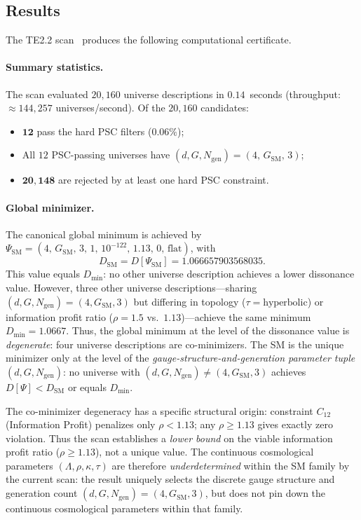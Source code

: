 \documentclass[11pt,twocolumn]{article}
\theoremstyle{remark}
\begin{document}
\subsection{Results}
\label{sec:results}

The TE2.2 scan~\cite{SpivackPSCConcordance} produces the following
computational certificate.

\paragraph{Summary statistics.}
The scan evaluated $20{,}160$ universe descriptions in $0.14$~seconds
(throughput: $\approx 144{,}257$ universes/second).
Of the $20{,}160$ candidates:
\begin{itemize}
  \item $\mathbf{12}$ pass the hard PSC filters ($0.06\%$);
  \item All $12$ PSC-passing universes have
        $(d,G,N_{\mathrm{gen}})=(4,\,G_{\mathrm{SM}},\,3)$;
  \item $\mathbf{20{,}148}$ are rejected by at least one hard
        PSC constraint.
\end{itemize}

\paragraph{Global minimizer.}
The canonical global minimum is achieved by
$\Psi_{\mathrm{SM}}=(4,\,G_{\mathrm{SM}},\,3,\,1,\,10^{-122},\,
1.13,\,0,\,\text{flat})$, with
\begin{equation}
  D_{\mathrm{SM}} = D[\Psi_{\mathrm{SM}}] = 1.066657903568035.
  \label{eq:dsm}
\end{equation}
This value equals $D_{\min}$: no other universe description achieves
a lower dissonance value.
However, three other universe descriptions---sharing
$(d,G,N_{\mathrm{gen}})=(4,G_{\mathrm{SM}},3)$ but differing in
topology ($\tau=\text{hyperbolic}$) or information profit ratio
($\rho=1.5$ vs.\ $1.13$)---achieve the same minimum $D_{\min}=1.0667$.
Thus, the global minimum at the level of the dissonance value is
\emph{degenerate}: four universe descriptions are co-minimizers.
The SM is the unique minimizer only at the level of the
\emph{gauge-structure-and-generation parameter tuple}
$(d,G,N_{\mathrm{gen}})$: no universe with
$(d,G,N_{\mathrm{gen}})\neq(4,G_{\mathrm{SM}},3)$ achieves
$D[\Psi]<D_{\mathrm{SM}}$ or equals $D_{\min}$.

The co-minimizer degeneracy has a specific structural origin:
constraint $C_{12}$ (Information Profit) penalizes only $\rho<1.13$;
any $\rho\geq 1.13$ gives exactly zero violation.
Thus the scan establishes a \emph{lower bound} on the viable information
profit ratio ($\rho\geq 1.13$), not a unique value.
The continuous cosmological parameters $(\Lambda, \rho, \kappa, \tau)$
are therefore \emph{underdetermined} within the SM family by the current
scan: the result uniquely selects the discrete gauge structure and
generation count $(d,G,N_{\mathrm{gen}})=(4,G_{\mathrm{SM}},3)$, but
does not pin down the continuous cosmological parameters within that
family.
\end{document}
